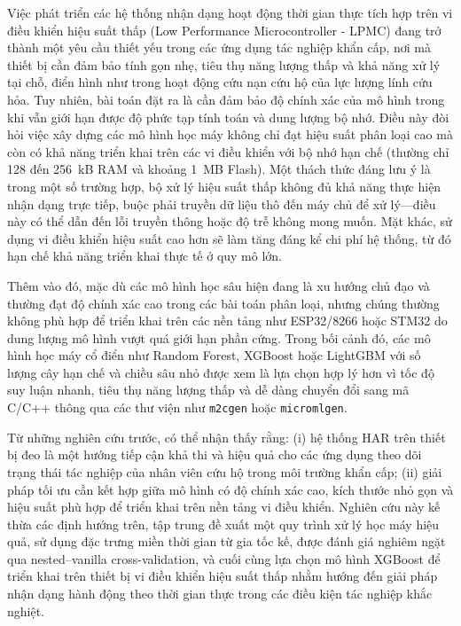 Việc phát triển các hệ thống nhận dạng hoạt động thời gian thực tích hợp trên vi điều khiển hiệu suất thấp (Low Performance Microcontroller - LPMC) đang trở thành một yêu cầu thiết yếu trong các ứng dụng tác nghiệp khẩn cấp, nơi mà thiết bị cần đảm bảo tính gọn nhẹ, tiêu thụ năng lượng thấp và khả năng xử lý tại chỗ, điển hình như trong hoạt động cứu nạn cứu hộ của lực lượng lính cứu hỏa. Tuy nhiên, bài toán đặt ra là cần đảm bảo độ chính xác của mô hình trong khi vẫn giới hạn được độ phức tạp tính toán và dung lượng bộ nhớ. Điều này đòi hỏi việc xây dựng các mô hình học máy không chỉ đạt hiệu suất phân loại cao mà còn có khả năng triển khai trên các vi điều khiển với bộ nhớ hạn chế (thường chỉ 128 đến 256~kB RAM và khoảng 1~MB Flash). Một thách thức đáng lưu ý là trong một số trường hợp, bộ xử lý hiệu suất thấp không đủ khả năng thực hiện nhận dạng trực tiếp, buộc phải truyền dữ liệu thô đến máy chủ để xử lý—điều này có thể dẫn đến lỗi truyền thông hoặc độ trễ không mong muốn. Mặt khác, sử dụng vi điều khiển hiệu suất cao hơn sẽ làm tăng đáng kể chi phí hệ thống, từ đó hạn chế khả năng triển khai thực tế ở quy mô lớn.

Thêm vào đó, mặc dù các mô hình học sâu hiện đang là xu hướng chủ đạo và thường đạt độ chính xác cao trong các bài toán phân loại, nhưng chúng thường không phù hợp để triển khai trên các nền tảng như ESP32/8266 hoặc STM32 do dung lượng mô hình vượt quá giới hạn phần cứng. Trong bối cảnh đó, các mô hình học máy cổ điển như Random Forest, XGBoost hoặc LightGBM với số lượng cây hạn chế và chiều sâu nhỏ được xem là lựa chọn hợp lý hơn vì tốc độ suy luận nhanh, tiêu thụ năng lượng thấp và dễ dàng chuyển đổi sang mã C/C++ thông qua các thư viện như \texttt{m2cgen} hoặc \texttt{micromlgen}.

Từ những nghiên cứu trước, có thể nhận thấy rằng: (i) hệ thống HAR trên thiết bị đeo là một hướng tiếp cận khả thi và hiệu quả cho các ứng dụng theo dõi trạng thái tác nghiệp của nhân viên cứu hộ trong môi trường khẩn cấp; (ii) giải pháp tối ưu cần kết hợp giữa mô hình có độ chính xác cao, kích thước nhỏ gọn và hiệu suất phù hợp để triển khai trên nền tảng vi điều khiển. Nghiên cứu này kế thừa các định hướng trên, tập trung đề xuất một quy trình xử lý học máy hiệu quả, sử dụng đặc trưng miền thời gian từ gia tốc kế, được đánh giá nghiêm ngặt qua nested–vanilla cross-validation, và cuối cùng lựa chọn mô hình XGBoost để triển khai trên thiết bị vi điều khiển hiệu suất thấp nhằm hướng đến giải pháp nhận dạng hành động theo thời gian thực trong các điều kiện tác nghiệp khắc nghiệt.

